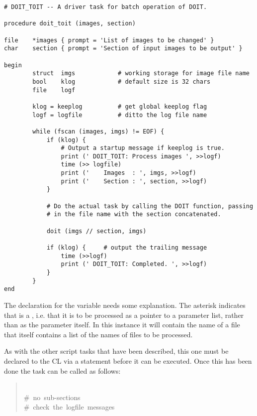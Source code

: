 \begin{verbatim}
# DOIT_TOIT -- A driver task for batch operation of DOIT.

procedure doit_toit (images, section)

file    *images { prompt = 'List of images to be changed' }
char    section { prompt = 'Section of input images to be output' }

begin
        struct  imgs            # working storage for image file name
        bool    klog            # default size is 32 chars
        file    logf

        klog = keeplog          # get global keeplog flag
        logf = logfile          # ditto the log file name

        while (fscan (images, imgs) != EOF) {                           
            if (klog) {
                # Output a startup message if keeplog is true.
                print (' DOIT_TOIT: Process images ', >>logf)
                time (>> logfile)
                print ('    Images  : ', imgs, >>logf)
                print ('    Section : ', section, >>logf)
            }

            # Do the actual task by calling the DOIT function, passing
            # in the file name with the section concatenated.

            doit (imgs // section, imgs)

            if (klog) {     # output the trailing message
                time (>>logf)
                print (' DOIT_TOIT: Completed. ', >>logf)
            }
        }
end
\end{verbatim}

\noindent
The declaration for the variable  needs
some explanation.  The asterisk  indicates that 
 is a , i.e. that
it is to be processed as a pointer to a parameter list, rather than 
as the parameter itself.  In this instance it will contain the name
of a file that itself contains a list of the names of files to be
processed. 

As with the other script tasks that have been described, this one must 
be declared to the CL via a  statement before it can
be executed. Once this has been done the task can be called as follows:

\begin{quotation}\noindent
{}  \\
 
	 \hfill \#~no~sub-sections \\
  \hfill \#~check~the~logfile~messages
\end{quotation}

